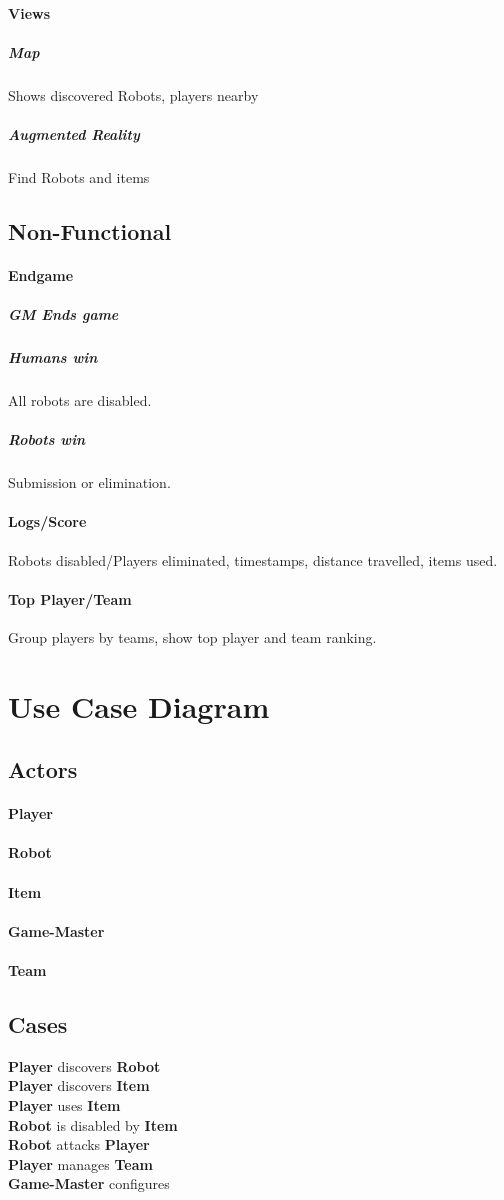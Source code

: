 \documentclass{article}
\begin{document}
\paragraph{Views}
\subparagraph{Map}
Shows discovered Robots, players nearby
\subparagraph{Augmented Reality}
Find Robots and items
\subsection{Non-Functional}
\paragraph{Endgame}
\subparagraph{GM Ends game}
\subparagraph{Humans win}
All robots are disabled.
\subparagraph{Robots win}
Submission or elimination.
\paragraph{Logs/Score}
Robots disabled/Players eliminated, timestamps, distance travelled, items used.
\paragraph{Top Player/Team}
Group players by teams, show top player and team ranking.
\section{Use Case Diagram}
\subsection{Actors}
\paragraph{Player}
\paragraph{Robot}
\paragraph{Item}
\paragraph{Game-Master}
\paragraph{Team}
\subsection{Cases}
\textbf{Player} discovers \textbf{Robot}\\
\textbf{Player} discovers \textbf{Item}\\
\textbf{Player} uses \textbf{Item}\\
\textbf{Robot} is disabled by \textbf{Item}\\
\textbf{Robot} attacks \textbf{Player}\\
\textbf{Player} manages \textbf{Team}\\
\textbf{Game-Master} configures\\
\end{document}
